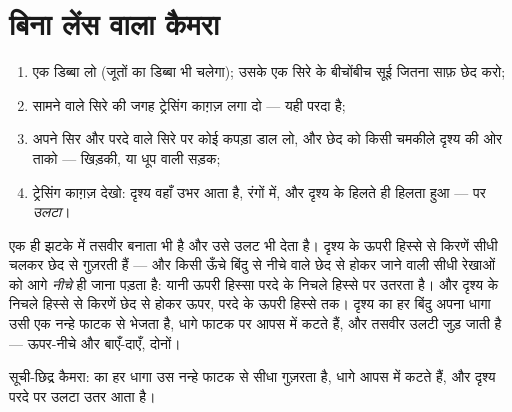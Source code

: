 \section{बिना लेंस वाला कैमरा}

\begin{method}[सूची-छिद्र कैमरा बनाना]\label{met:g6:light-propagation:pinhole}
\begin{enumerate}
  \item एक डिब्बा लो (जूतों का डिब्बा भी चलेगा); उसके एक सिरे के
        बीचोंबीच सूई जितना साफ़ छेद करो;
  \item सामने वाले सिरे की जगह ट्रेसिंग काग़ज़ लगा दो --- यही परदा
        है;
  \item अपने सिर और परदे वाले सिरे पर कोई कपड़ा डाल लो, और छेद को
        किसी चमकीले दृश्य की ओर ताको --- खिड़की, या धूप वाली सड़क;
  \item ट्रेसिंग काग़ज़ देखो: दृश्य वहाँ उभर आता है, रंगों में, और
        दृश्य के हिलते ही हिलता हुआ --- पर \emph{उलटा}।
\end{enumerate}
\end{method}

\begin{proposition}[प्रतिबिंब उलटा क्यों होता है]\label{prop:g6:light-propagation:inverted}
 एक ही झटके में तसवीर बनाता भी है और उसे उलट भी देता
है। दृश्य के ऊपरी हिस्से से किरणें सीधी चलकर छेद से गुज़रती हैं ---
और किसी ऊँचे बिंदु से नीचे वाले छेद से होकर जाने वाली सीधी रेखाओं को
आगे \emph{नीचे} ही जाना पड़ता है: यानी ऊपरी हिस्सा परदे के निचले
हिस्से पर उतरता है। और दृश्य के निचले हिस्से से किरणें छेद से होकर ऊपर,
परदे के ऊपरी हिस्से तक। दृश्य का हर बिंदु अपना धागा उसी एक नन्हे
फाटक से भेजता है, धागे फाटक पर आपस में कटते हैं, और तसवीर उलटी जुड़
जाती है --- ऊपर-नीचे और बाएँ-दाएँ, दोनों।
\end{proposition}

\begin{omfigure}

{\small सूची-छिद्र कैमरा:  का हर धागा उस नन्हे फाटक से सीधा
गुज़रता है, धागे आपस में कटते हैं, और दृश्य परदे पर उलटा उतर आता है।}
\end{omfigure}

